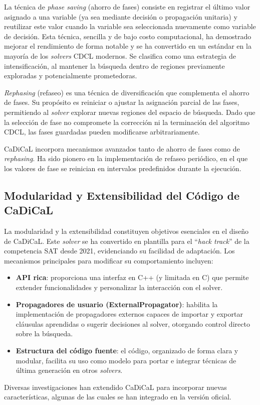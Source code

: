 La técnica de \textit{phase saving} (ahorro de fases) consiste en registrar el último valor asignado a una variable (ya sea mediante decisión o propagación unitaria) y reutilizar este valor cuando la variable sea seleccionada nuevamente como variable de decisión. Esta técnica, sencilla y de bajo costo computacional, ha demostrado mejorar el rendimiento de forma notable y se ha convertido en un estándar en la mayoría de los \textit{solvers} CDCL modernos. Se clasifica como una estrategia de intensificación, al mantener la búsqueda dentro de regiones previamente exploradas y potencialmente prometedoras. %

\textit{Rephasing} (refaseo) es una técnica de diversificación que complementa el ahorro de fases. Su propósito es reiniciar o ajustar la asignación parcial de las fases, permitiendo al \textit{solver} explorar nuevas regiones del espacio de búsqueda. Dado que la selección de fase no compromete la corrección ni la terminación del algoritmo CDCL, las fases guardadas pueden modificarse arbitrariamente.%

CaDiCaL incorpora mecanismos avanzados tanto de ahorro de fases como de \textit{rephasing}. %
Ha sido pionero en la implementación de refaseo periódico, en el que los valores de fase se reinician en intervalos predefinidos durante la ejecución. 



\subsection{Modularidad y Extensibilidad del Código de CaDiCaL}
La modularidad y la extensibilidad constituyen objetivos esenciales en el diseño de CaDiCaL. %
Este \textit{solver} se ha convertido en plantilla para el ``\textit{hack track}'' de la competencia SAT desde 2021, evidenciando su facilidad de adaptación. Los mecanismos principales para modificar su comportamiento incluyen:
\begin{itemize}
  \item \textbf{API rica}: proporciona una interfaz en C++ (y limitada en C) que permite extender funcionalidades y personalizar la interacción con el solver.
  \item \textbf{Propagadores de usuario (ExternalPropagator)}: habilita la implementación de propagadores externos capaces de importar y exportar cláusulas aprendidas o sugerir decisiones al solver, otorgando control directo sobre la búsqueda.
  \item \textbf{Estructura del código fuente}: el código, organizado de forma clara y modular, facilita su uso como modelo para portar e integrar técnicas de última generación en otros \textit{solvers}.
\end{itemize}
Diversas investigaciones han extendido CaDiCaL para incorporar nuevas características, algunas de las cuales se han integrado en la versión oficial.


